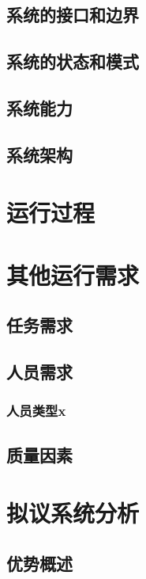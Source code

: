\documentclass{ctexart}
\begin{document}
\subsection{系统的接口和边界}

\subsection{系统的状态和模式}

\subsection{系统能力}

\subsection{系统架构}

\newpage
\section{运行过程}

\newpage
\section{其他运行需求}

\subsection{任务需求}

\subsection{人员需求}

\subsubsection{人员类型x}

\subsection{质量因素}

\newpage
\section{拟议系统分析}

\subsection{优势概述}
\end{document}
